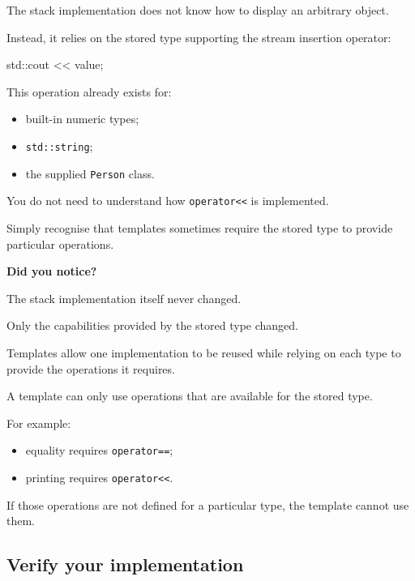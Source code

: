 \documentclass{csc2059practical}
\begin{document}
The stack implementation does not know how to display an arbitrary object.

Instead, it relies on the stored type supporting the stream insertion operator:

\begin{cppcode}
std::cout << value;
\end{cppcode}

This operation already exists for:

\begin{itemize}
    \item built-in numeric types;
    \item \texttt{std::string};
    \item the supplied \texttt{Person} class.
\end{itemize}

You do not need to understand how \texttt{operator<<} is implemented.

Simply recognise that templates sometimes require the stored type to provide particular operations.

\begin{tipbox}
\textbf{Did you notice?}

The stack implementation itself never changed.

Only the capabilities provided by the stored type changed.

Templates allow one implementation to be reused while relying on each type to provide the operations it requires.
\end{tipbox}

\begin{commonerror}
A template can only use operations that are available for the stored type.

For example:

\begin{itemize}
    \item equality requires \texttt{operator==};
    \item printing requires \texttt{operator<<}.
\end{itemize}

If those operations are not defined for a particular type, the template cannot use them.
\end{commonerror}

\subsection{Verify your implementation}
\end{document}
